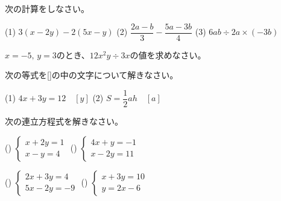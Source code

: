 \documentclass[
  12pt,a4paper,lualatex,ja=standard]{bxjsarticle}
\begin{document}
\pagestyle{plain}

\begin{flushleft}

\noindent{} \hspace{1pt}次の計算をしなさい。

(1) $3(x -2y) - 2(5x -y)$ \hspace{5mm} (2) $\dfrac{2a-b}{3} - \dfrac{5a -3b}{4}$ \hspace{5mm} (3) $6ab \div 2a \times (-3b)$

\vspace{25mm}

\noindent{} \hspace{1pt}$x = -5, \, y = 3$のとき、$12x^2y \div 3x$の値を求めなさい。

\vspace{20mm}

\noindent{} \hspace{1pt}次の等式を[\hspace{3mm}]の中の文字について解きなさい。

(1) $4x + 3y = 12 \quad [y]$ \hspace{5mm}(2) $S = \dfrac{1}{2}ah \quad [a]$

\vspace{20mm}

\noindent{} \hspace{1pt}次の連立方程式を解きなさい。

()\hspace{2.5pt}
$
\left\{
\begin{array}{l}
  x + 2y =1 \\
  x -y = 4
\end{array}
\right.
$
\hspace{50mm}
()\hspace{2.5pt}
$
\left\{
\begin{array}{l}
  4x + y = -1 \\
  x -2y = 11
\end{array}
\right.
$

\vfill

()\hspace{2.5pt}
$
\left\{
\begin{array}{l}
  2x + 3y =4 \\
  5x -2y = -9
\end{array}
\right.
$
\hspace{50mm}
()\hspace{2.5pt}
$
\left\{
\begin{array}{l}
  x + 3y = 10 \\
  y = 2x -6
\end{array}
\right.
$


\end{flushleft}
\end{document}
